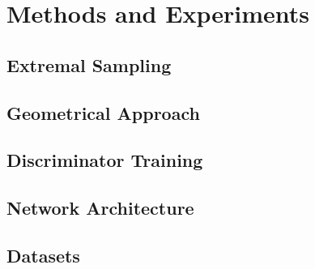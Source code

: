 \chapter{Methods and Experiments}%
\label{cha:methods}


\section{Extremal Sampling}%
\label{sec:extremal_sampling}


\section{Geometrical Approach}%
\label{sec:geometrical_approach}


\section{Discriminator Training}%
\label{sec:discriminator_training}


\section{Network Architecture}%
\label{sec:network_architecture}


\section{Datasets}%
\label{sec:datasets}


